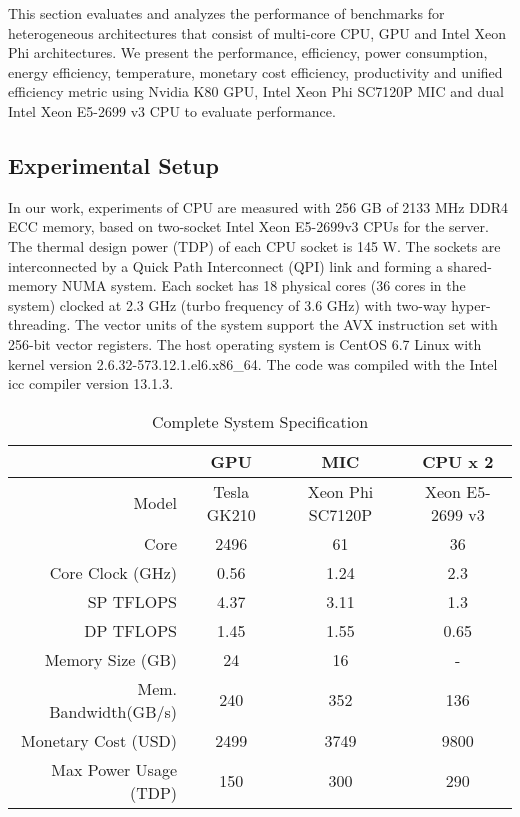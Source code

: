 
This section evaluates and analyzes the performance of benchmarks for heterogeneous architectures that consist of multi-core CPU, GPU and Intel Xeon Phi architectures. We present the performance, efficiency, power consumption, energy efficiency, temperature, monetary cost efficiency, productivity and unified efficiency metric using Nvidia K80 GPU, Intel Xeon Phi SC7120P MIC and dual Intel Xeon E5-2699 v3 CPU to evaluate performance. 


\subsection{Experimental Setup}
In our work, experiments of CPU are measured with 256 GB of 2133 MHz DDR4 ECC memory, based on two-socket Intel Xeon E5-2699v3 CPUs for the server. The thermal design power (TDP) of each CPU socket is 145 W. The sockets are interconnected by a Quick Path Interconnect (QPI) link and forming a shared-memory NUMA system. Each socket has 18 physical cores (36 cores in the system) clocked at 2.3 GHz (turbo frequency of 3.6 GHz) with two-way hyper-threading. The vector units of the system support the AVX instruction set with 256-bit vector registers. The host operating system is CentOS 6.7 Linux with kernel version 2.6.32-573.12.1.el6.x86\_64. The code was compiled with the Intel icc compiler version 13.1.3.


\begin{table}[htbp]
  \centering
      \caption{Complete System Specification}
    \begin{adjustbox}{width=0.5\textwidth}
    \begin{tabular}{rccc}
    \toprule
          & GPU   & MIC   & CPU x 2 \\
    \midrule
    Model & Tesla GK210 & Xeon Phi SC7120P & Xeon E5-2699 v3 \\
    Core  & 2496  & 61    & 36 \\
    Core Clock (GHz) & 0.56  & 1.24  & 2.3 \\
    SP TFLOPS & 4.37  & 3.11  & 1.3 \\
    DP TFLOPS & 1.45  & 1.55  & 0.65 \\
    Memory Size (GB) & 24    & 16    & - \\
    Mem. Bandwidth(GB/s) & 240   & 352   & 136 \\
    Monetary Cost (USD) & 2499  & 3749  & 9800 \\
    Max Power Usage (TDP) & 150   & 300   & 290 \\
    \bottomrule
    \end{tabular}%
    \label{tab:specification}
    \end{adjustbox}

\end{table}%

